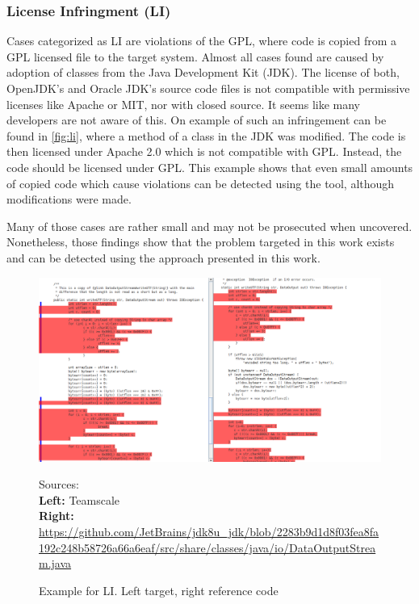 \subsubsection*{License Infringment (LI)}
Cases categorized as LI are violations of the GPL, where code is copied from a GPL licensed file to the target system.
Almost all cases found are caused by adoption of classes from the Java Development Kit (JDK).
The license of both, OpenJDK's and Oracle JDK's source code files is not compatible with permissive licenses like Apache or MIT, nor with closed source.
It seems like many developers are not aware of this.
On example of such an infringement can be found in \autoref{fig:li}, where a method of a class in the JDK was modified.
The code is then licensed under Apache 2.0 which is not compatible with GPL.
Instead, the code should be licensed under GPL.
This example shows that even small amounts of copied code which cause violations can be detected using the tool, although modifications were made.

Many of those cases are rather small and may not be prosecuted when uncovered.
Nonetheless, those findings show that the problem targeted in this work exists and can be detected using the approach presented in this work.
\begin{figure}[htpb]
	\centering
	\includegraphics[width=\linewidth]{figures/li.png}
	\caption{Example for LI. Left target, right reference code}
	{
		\begin{flushleft}
			\tiny Sources:\\
			\textbf{Left:}
			Teamscale\\
			\textbf{Right:}
			\href{https://github.com/JetBrains/jdk8u_jdk/blob/2283b9d1d8f03fea8fa192c248b58726a66a6eaf/src/share/classes/java/io/DataOutputStream.java}{https://github.com/JetBrains/jdk8u\_jdk/blob/2283b9d1d8f03fea8fa192c248b58726a66a6eaf/src/share/classes/java/io/DataOutputStream.java}
		\end{flushleft}
	}
	\label{fig:li}
\end{figure}

